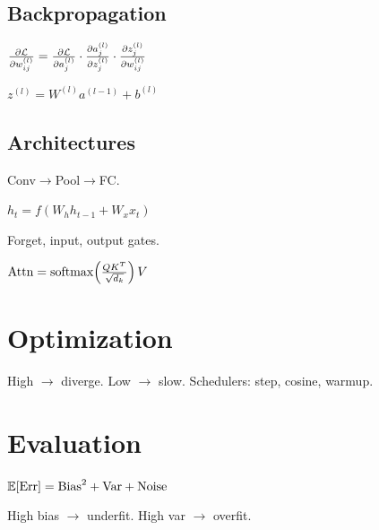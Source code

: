 \subsection{Backpropagation}
\begin{defbox}
$\frac{\partial \mathcal{L}}{\partial w_{ij}^{(l)}} = \frac{\partial \mathcal{L}}{\partial a_j^{(l)}} \cdot \frac{\partial a_j^{(l)}}{\partial z_j^{(l)}} \cdot \frac{\partial z_j^{(l)}}{\partial w_{ij}^{(l)}}$

$z^{(l)} = W^{(l)}a^{(l-1)} + b^{(l)}$
\end{defbox}

\subsection{Architectures}
\begin{deflist}
  \item[CNN] Conv$\to$Pool$\to$FC.
  \item[RNN] $h_t = f(W_h h_{t-1} + W_x x_t)$
  \item[LSTM] Forget, input, output gates.
  \item[Transformer] $\text{Attn} = \operatorname{softmax}\!\left(\frac{QK^T}{\sqrt{d_k}}\right)V$
\end{deflist}


\section{Optimization}


\begin{notebox}
High $\to$ diverge. Low $\to$ slow.
Schedulers: step, cosine, warmup.
\end{notebox}

\section{Evaluation}


\begin{thmbox}
$\mathbb{E}[\text{Err}] = \text{Bias}^2 + \text{Var} + \text{Noise}$

High bias $\to$ underfit. High var $\to$ overfit.
\end{thmbox}
